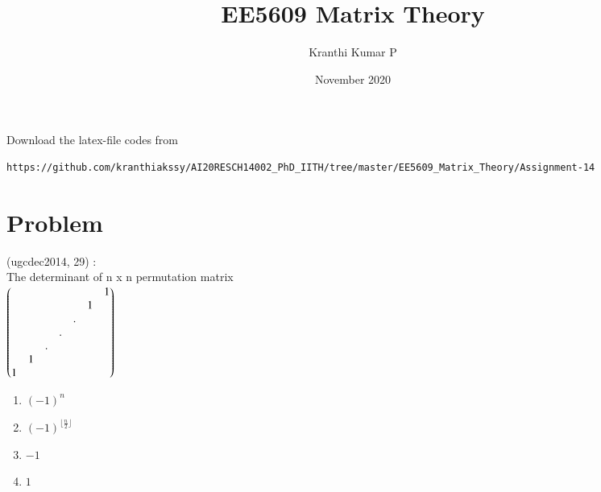 \documentclass[journal,12pt]{IEEEtran}
\begin{document}
     \def\rightbox#1{\makebox[0in][r]{#1}}
     \def\centbox#1{\makebox[0in]{#1}}
     \def\topbox#1{\raisebox{-\baselineskip}[0in][0in]{#1}}
     \def\midbox#1{\raisebox{-0.5\baselineskip}[0in][0in]{#1}}
\vspace{3cm}
\title{EE5609 Matrix Theory}
\author{Kranthi Kumar P}
\date{November 2020}
\maketitle
\bigskip
\renewcommand{\thefigure}{\theenumi}
\renewcommand{\thetable}{\theenumi}

Download the latex-file codes from 
\begin{lstlisting}
https://github.com/kranthiakssy/AI20RESCH14002_PhD_IITH/tree/master/EE5609_Matrix_Theory/Assignment-14
\end{lstlisting}
\section{\textbf{Problem}}
(ugcdec2014, 29) : \\
The determinant of n x n permutation matrix\\
$\begin{pmatrix} & & & & & &1\\ & & & & &1& \\ & & & &.& & \\ & & &.& & & \\ & &.& & & & \\ &1& & & & & \\1& & & & & &  \end{pmatrix}$
\begin{enumerate} %
\item $(-1)^n $
\item $(-1)^{\lfloor \frac{n}{2} \rfloor} $
\item $-1 $
\item $1$ 
\end{enumerate}
\end{document}
